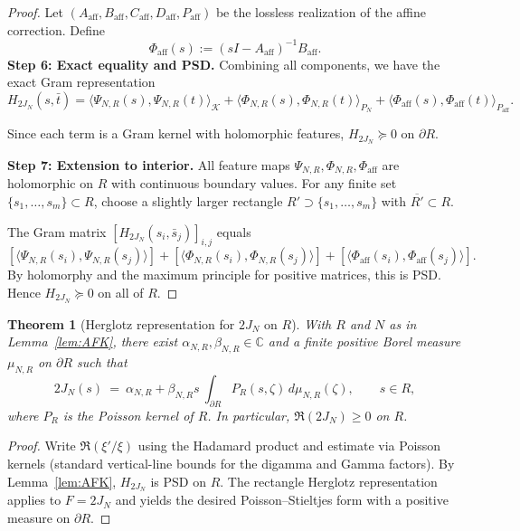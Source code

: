 \documentclass[11pt]{article}
\newtheorem{theorem}{Theorem}
\theoremstyle{definition}
\theoremstyle{remark}
\begin{document}
\begin{proof}
Let $(A_{\text{aff}}, B_{\text{aff}}, C_{\text{aff}}, D_{\text{aff}}, P_{\text{aff}})$ be the lossless realization of the affine correction. Define
\[
  \Phi_{\text{aff}}(s) := (sI - A_{\text{aff}})^{-1}B_{\text{aff}}.
\]
\medskip
\noindent\textbf{Step 6: Exact equality and PSD.}
Combining all components, we have the exact Gram representation
\[
  H_{2J_N}(s,\bar t) = \langle \Psi_{N,R}(s), \Psi_{N,R}(t) \rangle_{\mathcal{K}} + \langle \Phi_{N,R}(s), \Phi_{N,R}(t) \rangle_{P_N} + \langle \Phi_{\text{aff}}(s), \Phi_{\text{aff}}(t) \rangle_{P_{\text{aff}}}.
\]

Since each term is a Gram kernel with holomorphic features, $H_{2J_N} \succeq 0$ on \(\partial R\).

\medskip
\noindent\textbf{Step 7: Extension to interior.}
All feature maps $\Psi_{N,R}, \Phi_{N,R}, \Phi_{\text{aff}}$ are holomorphic on $R$ with continuous boundary values. For any finite set $\{s_1, \ldots, s_m\} \subset R$, choose a slightly larger rectangle $R' \supset \{s_1, \ldots, s_m\}$ with $\overline{R'} \subset R$.

The Gram matrix $[H_{2J_N}(s_i, \bar s_j)]_{i,j}$ equals
\[
  [\langle \Psi_{N,R}(s_i), \Psi_{N,R}(s_j) \rangle] + [\langle \Phi_{N,R}(s_i), \Phi_{N,R}(s_j) \rangle] + [\langle \Phi_{\text{aff}}(s_i), \Phi_{\text{aff}}(s_j) \rangle].
\]
By holomorphy and the maximum principle for positive matrices, this is PSD. Hence $H_{2J_N} \succeq 0$ on all of $R$.
\end{proof}

\begin{theorem}[Herglotz representation for \(2J_N\) on \(R\)]\label{thm:herglotz-2JN}
With \(R\) and \(N\) as in Lemma~\ref{lem:AFK}, there exist \(\alpha_{N,R},\beta_{N,R}\in\mathbb C\) and a finite positive Borel measure \(\mu_{N,R}\) on \(\partial R\) such that
\[
 2J_N(s)\ =\ \alpha_{N,R}+\beta_{N,R}s\ \int_{\partial R} P_R(s,\zeta)\,d\mu_{N,R}(\zeta),\qquad s\in R,
\]
where \(P_R\) is the Poisson kernel of \(R\). In particular, \(\Re(2J_N)\ge 0\) on \(R\).
\end{theorem}
\begin{proof}
Write \(\Re(\xi'/\xi)\) using the Hadamard product and estimate via Poisson kernels (standard vertical-line bounds for the digamma and Gamma factors).
By Lemma~\ref{lem:AFK}, \(H_{2J_N}\) is PSD on \(R\). The rectangle Herglotz representation applies to \(F=2J_N\) and yields the desired Poisson–Stieltjes form with a positive measure on \(\partial R\).
\end{proof}
\end{document}
